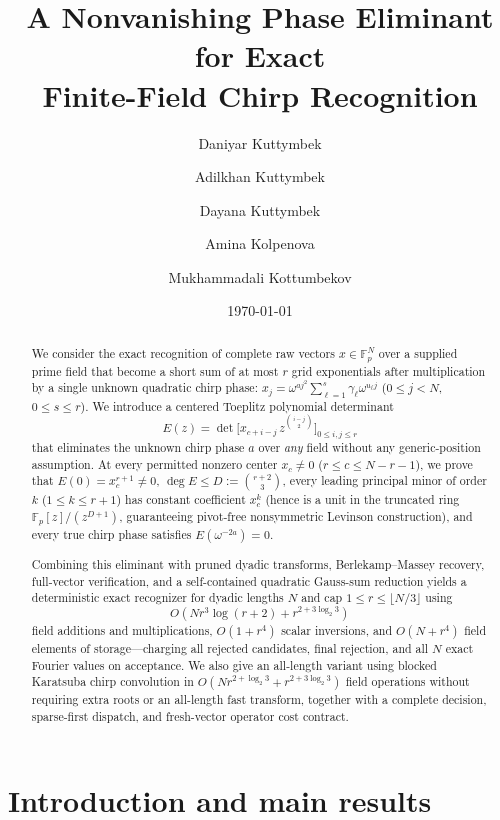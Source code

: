\documentclass[11pt,reqno]{amsart}
\title[A Nonvanishing Phase Eliminant for Finite-Field Chirps]{A Nonvanishing Phase Eliminant for Exact\\Finite-Field Chirp Recognition}
\author[D. Kuttymbek]{Daniyar Kuttymbek}
\author[A. Kuttymbek]{Adilkhan Kuttymbek}
\author[D. Kuttymbek]{Dayana Kuttymbek}
\author[A. Kolpenova]{Amina Kolpenova}
\author[M. Kottumbekov]{Mukhammadali Kottumbekov}
\date{\today}
\numberwithin{equation}{section}
\theoremstyle{definition}
\theoremstyle{remark}
\newcommand{\F}{\mathbb{F}}
\begin{document}
\begin{abstract}
We consider the exact recognition of complete raw vectors $x\in\F_p^N$ over a supplied prime field that become a short sum of at most $r$ grid exponentials after multiplication by a single unknown quadratic chirp phase: $x_j = \omega^{aj^2}\sum_{\ell=1}^s \gamma_\ell \omega^{u_\ell j}$ ($0\le j<N$, $0\le s\le r$). We introduce a centered Toeplitz polynomial determinant
\[
E(z) = \det\bigl[x_{c+i-j}\,z^{\binom{i-j}{2}}\bigr]_{0\le i,j\le r}
\]
that eliminates the unknown chirp phase $a$ over \emph{any} field without any generic-position assumption. At every permitted nonzero center $x_c\neq 0$ ($r\le c\le N-r-1$), we prove that $E(0)=x_c^{r+1}\neq 0$, $\deg E \le D := \binom{r+2}{3}$, every leading principal minor of order $k$ ($1\le k\le r+1$) has constant coefficient $x_c^k$ (hence is a unit in the truncated ring $\F_p[z]/(z^{D+1})$, guaranteeing pivot-free nonsymmetric Levinson construction), and every true chirp phase satisfies $E(\omega^{-2a})=0$.

Combining this eliminant with pruned dyadic transforms, Berlekamp--Massey recovery, full-vector verification, and a self-contained quadratic Gauss-sum reduction yields a deterministic exact recognizer for dyadic lengths $N$ and cap $1\le r\le\lfloor N/3\rfloor$ using
\[
O\!\left(N r^3 \log(r+2) + r^{2+3\log_2 3}\right)
\]
field additions and multiplications, $O(1+r^4)$ scalar inversions, and $O(N+r^4)$ field elements of storage---charging all rejected candidates, final rejection, and all $N$ exact Fourier values on acceptance. We also give an all-length variant using blocked Karatsuba chirp convolution in $O(Nr^{2+\log_2 3} + r^{2+3\log_2 3})$ field operations without requiring extra roots or an all-length fast transform, together with a complete decision, sparse-first dispatch, and fresh-vector operator cost contract.
\end{abstract}

\maketitle

\section{Introduction and main results}
\label{sec:intro}
\end{document}

